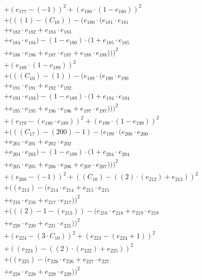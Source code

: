 \documentclass[10pt, a4paper]{article}
\begin{document}
\begin{small}
\begin{align*}
& + (e_{177} - (-1))^{2} + (e_{180} \cdot (1 - e_{180}))^{2} \\
& + (((1) - (C_{10})) - (e_{180} \cdot (e_{181} \cdot e_{181} \\
& + e_{182} \cdot e_{182} + e_{183} \cdot e_{183} \\
& + e_{184} \cdot e_{184}) - (1 - e_{180}) \cdot (1 + e_{185} \cdot e_{185} \\
& + e_{186} \cdot e_{186} + e_{187} \cdot e_{187} + e_{188} \cdot e_{188})))^{2} \\
& + (e_{189} \cdot (1 - e_{189}))^{2} \\
& + (((C_{10}) - (1)) - (e_{189} \cdot (e_{190} \cdot e_{190} \\
& + e_{191} \cdot e_{191} + e_{192} \cdot e_{192} \\
& + e_{193} \cdot e_{193}) - (1 - e_{189}) \cdot (1 + e_{194} \cdot e_{194} \\
& + e_{195} \cdot e_{195} + e_{196} \cdot e_{196} + e_{197} \cdot e_{197})))^{2} \\
& + (e_{179} - (e_{180} \cdot e_{189}))^{2} + (e_{199} \cdot (1 - e_{199}))^{2} \\
& + (((C_{17}) - (200) - 1) - (e_{199} \cdot (e_{200} \cdot e_{200} \\
& + e_{201} \cdot e_{201} + e_{202} \cdot e_{202} \\
& + e_{203} \cdot e_{203}) - (1 - e_{199}) \cdot (1 + e_{204} \cdot e_{204} \\
& + e_{205} \cdot e_{205} + e_{206} \cdot e_{206} + e_{207} \cdot e_{207})))^{2} \\
& + (e_{208} - (-1))^{2} + ((C_{10}) - ((2)  \cdot  (e_{212}) + e_{213}))^{2} \\
& + ((e_{213}) - (e_{214} \cdot e_{214} + e_{215} \cdot e_{215} \\
& + e_{216} \cdot e_{216} + e_{217} \cdot e_{217}))^{2} \\
& + (((2) - 1 - (e_{213})) - (e_{218} \cdot e_{218} + e_{219} \cdot e_{219} \\
& + e_{220} \cdot e_{220} + e_{221} \cdot e_{221}))^{2} \\
& + (e_{224} - (3  \cdot  C_{10}))^{2} + (e_{223} - (e_{224} + 1))^{2} \\
& + ((e_{223}) - ((2)  \cdot  (e_{222}) + e_{225}))^{2} \\
& + ((e_{225}) - (e_{226} \cdot e_{226} + e_{227} \cdot e_{227} \\
& + e_{228} \cdot e_{228} + e_{229} \cdot e_{229}))^{2} \\

\end{align*}
\end{small}
\end{document}
